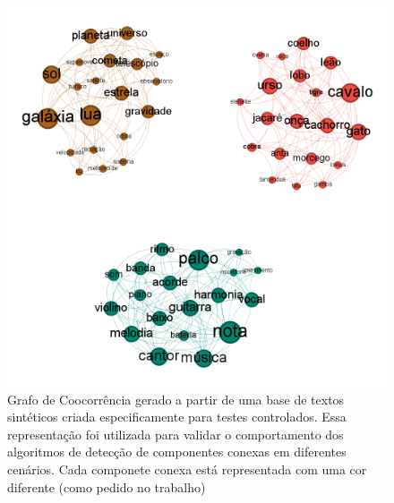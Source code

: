 \documentclass[12pt]{article}
\begin{document}
\begin{figure}[H]
    \centering
    \includegraphics[width=1\textwidth]{grafoTextoTeste.png}
    \caption{Grafo de Coocorrência gerado a partir de uma base de textos sintéticos criada especificamente para testes controlados. Essa representação foi utilizada para validar o comportamento dos algoritmos de detecção de componentes conexas em diferentes cenários. Cada componete conexa está representada com uma cor diferente (como pedido no trabalho)}
\end{figure}
\end{document}
